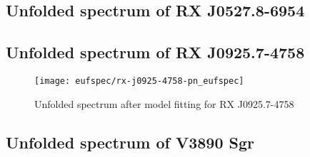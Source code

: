 		\subsection{Unfolded spectrum of RX J0527.8-6954}
		
		\subsection{Unfolded spectrum of RX J0925.7-4758}
			\begin{figure}[h!]
				\centering
				\texttt{[image: eufspec/rx-j0925-4758-pn\_eufspec]}
				\caption{Unfolded spectrum after model fitting for RX J0925.7-4758}
				\label{result:euf-rx-j0925}
			\end{figure}
		
		\subsection{Unfolded spectrum of V3890 Sgr}
    
%    
%    
